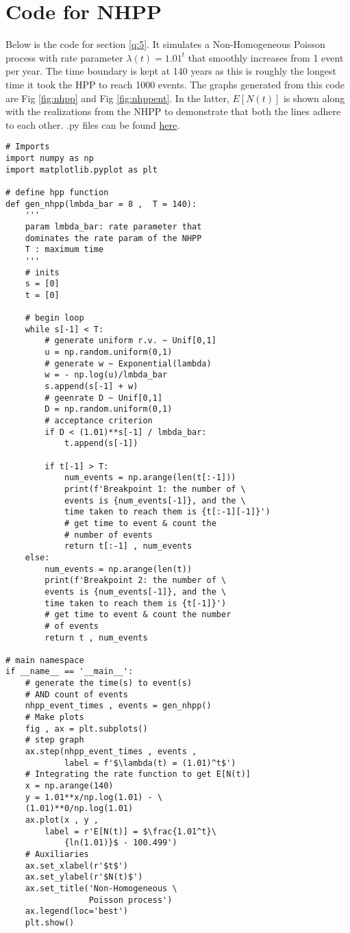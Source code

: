 \documentclass[%
 reprint,
 amsmath,amssymb,
 aps,
]{revtex4-2}
\theoremstyle{definition}
\begin{document}
\section{\label{app:nhppcode}Code for NHPP}
Below is the code for section \ref{q:5}. It simulates a Non-Homogeneous Poisson process with rate parameter $\lambda(t)=1.01^t$ that smoothly increases from 1 event per year. The time boundary is kept at 140 years as this is roughly the longest time it took the HPP to reach 1000 events. The graphs generated from this code are Fig \ref{fig:nhpp} and Fig \ref{fig:nhppent}. In the latter, $E[N(t)]$ is shown along with the realizations from the NHPP to demonstrate	 that both the lines adhere to each other. .py files can be found \href{https://github.com/sourasen1011/Stochastic_Processes/blob/main/CA3/project_helper/NHPP.py}{here}.
\begin{verbatim}
# Imports
import numpy as np
import matplotlib.pyplot as plt

# define hpp function
def gen_nhpp(lmbda_bar = 8 ,  T = 140):
    '''
    param lmbda_bar: rate parameter that 
    dominates the rate param of the NHPP
    T : maximum time
    '''
    # inits
    s = [0]
    t = [0]

    # begin loop
    while s[-1] < T:
        # generate uniform r.v. ~ Unif[0,1]
        u = np.random.uniform(0,1)
        # generate w ~ Exponential(lambda) 
        w = - np.log(u)/lmbda_bar 
        s.append(s[-1] + w)
        # geenrate D ~ Unif[0,1]
        D = np.random.uniform(0,1)
        # acceptance criterion
        if D < (1.01)**s[-1] / lmbda_bar:
            t.append(s[-1])
        
        if t[-1] > T:
            num_events = np.arange(len(t[:-1]))
            print(f'Breakpoint 1: the number of \
            events is {num_events[-1]}, and the \
            time taken to reach them is {t[:-1][-1]}')
            # get time to event & count the 
            # number of events
            return t[:-1] , num_events
    else:
        num_events = np.arange(len(t))
        print(f'Breakpoint 2: the number of \
        events is {num_events[-1]}, and the \
        time taken to reach them is {t[-1]}')
        # get time to event & count the number 
        # of events
        return t , num_events

# main namespace
if __name__ == '__main__': 
    # generate the time(s) to event(s) 
    # AND count of events
    nhpp_event_times , events = gen_nhpp() 
    # Make plots
    fig , ax = plt.subplots()
    # step graph
    ax.step(nhpp_event_times , events , 
            label = f'$\lambda(t) = (1.01)^t$') 
    # Integrating the rate function to get E[N(t)]
    x = np.arange(140)
    y = 1.01**x/np.log(1.01) - \
    (1.01)**0/np.log(1.01)
    ax.plot(x , y , 
    	label = r'E[N(t)] = $\frac{1.01^t}\
            {ln(1.01)}$ - 100.499')
    # Auxiliaries
    ax.set_xlabel(r'$t$')
    ax.set_ylabel(r'$N(t)$')
    ax.set_title('Non-Homogeneous \
                 Poisson process')
    ax.legend(loc='best')
    plt.show()

\end{verbatim}

\nocite{*}

\end{document}
